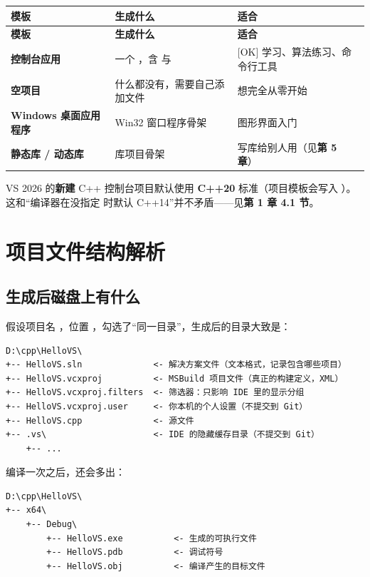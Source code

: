 \begin{longtable}{L{4.0cm}L{5.6cm}L{5.0cm}}\toprule
\textbf{模板} & \textbf{生成什么} & \textbf{适合} \\ \midrule \endfirsthead
\toprule \textbf{模板} & \textbf{生成什么} & \textbf{适合} \\ \midrule \endhead
\bottomrule \endlastfoot
\textbf{控制台应用} & 一个 ，含  与  & [OK] 学习、算法练习、命令行工具 \\
\textbf{空项目} & 什么都没有，需要自己添加文件 & 想完全从零开始 \\
\textbf{Windows 桌面应用程序} & Win32 窗口程序骨架 & 图形界面入门 \\
\textbf{静态库 / 动态库} & 库项目骨架 & 写库给别人用（见\textbf{第 5 章}） \\
\end{longtable}

\begin{tipbox}[提示]
VS 2026 的\textbf{新建} C++ 控制台项目默认使用 \textbf{C++20} 标准（项目模板会写入 ）。这和“编译器在没指定  时默认 C++14”并不矛盾——见\textbf{第 1 章 4.1 节}。
\end{tipbox}

\section{项目文件结构解析}

\subsection{生成后磁盘上有什么}

假设项目名 ，位置 ，勾选了“同一目录”，生成后的目录大致是：

\begin{lstlisting}[style=textstyle]
D:\cpp\HelloVS\
+-- HelloVS.sln              <- 解决方案文件（文本格式，记录包含哪些项目）
+-- HelloVS.vcxproj          <- MSBuild 项目文件（真正的构建定义，XML）
+-- HelloVS.vcxproj.filters  <- 筛选器：只影响 IDE 里的显示分组
+-- HelloVS.vcxproj.user     <- 你本机的个人设置（不提交到 Git）
+-- HelloVS.cpp              <- 源文件
+-- .vs\                     <- IDE 的隐藏缓存目录（不提交到 Git）
    +-- ...
\end{lstlisting}

编译一次之后，还会多出：

\begin{lstlisting}[style=textstyle]
D:\cpp\HelloVS\
+-- x64\
    +-- Debug\
        +-- HelloVS.exe          <- 生成的可执行文件
        +-- HelloVS.pdb          <- 调试符号
        +-- HelloVS.obj          <- 编译产生的目标文件
\end{lstlisting}

